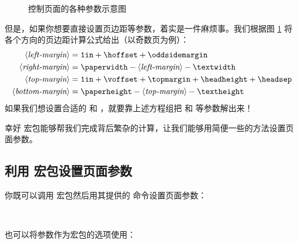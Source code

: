 \begin{figure}[!p]
\currentpage
\oddpagelayouttrue
\pagediagram
\caption{控制页面的各种参数示意图} \label{fig:layouts}
\end{figure}

但是，如果你想要直接设置页边距等参数，着实是一件麻烦事。我们根据图 \ref{fig:layouts} 将各个方向的页边距计算公式给出（以奇数页为例）：
\begin{align*}
\langle\text{\itshape left-margin}\rangle   &= \text{\ttfamily 1in} 
                                             + \text{\cmd{hoffset}}
                                             + \text{\cmd{oddsidemargin}} \\
\langle\text{\itshape right-margin}\rangle  &= \text{\cmd{paperwidth}} 
                                             - \langle\text{\itshape left-margin}\rangle
                                             - \text{\cmd{textwidth}} \\
\langle\text{\itshape top-margin}\rangle    &= \text{\ttfamily 1in} 
                                             + \text{\cmd{voffset}}
                                             + \text{\cmd{topmargin}}
                                             + \text{\cmd{headheight}}
                                             + \text{\cmd{headsep}} \\
\langle\text{\itshape bottom-margin}\rangle &= \text{\cmd{paperheight}}
                                             - \langle\text{\itshape top-margin}\rangle
                                             - \text{\cmd{textheight}}
\end{align*}
如果我们想设置合适的  和 ，就要靠上述方程组把  和  等参数解出来！

幸好  宏包能够帮我们完成背后繁杂的计算，让我们能够用简便一些的方法设置页面参数。

\subsection{利用  宏包设置页面参数}\label{subsec:geometry}

你既可以调用  宏包然后用其提供的  命令设置页面参数：
\begin{command}
 \\
\end{command}
也可以将参数作为宏包的选项使用：
\begin{command}
\end{command}

